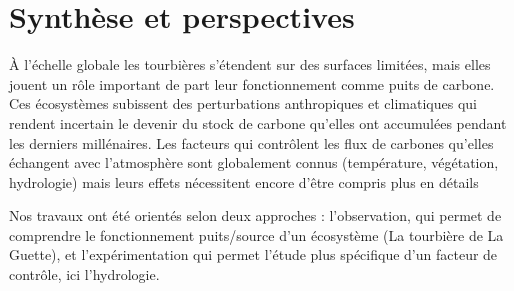 \chapter*{Synthèse et perspectives}
\newpage




À l'échelle globale les tourbières s'étendent sur des surfaces limitées, mais elles jouent un rôle important de part leur fonctionnement comme puits de carbone.
Ces écosystèmes subissent des perturbations anthropiques et climatiques qui rendent incertain le devenir du stock de carbone qu'elles ont accumulées pendant les derniers millénaires.
Les facteurs qui contrôlent les flux de carbones qu'elles échangent avec l'atmosphère sont globalement connus (température, végétation, hydrologie) mais leurs effets nécessitent encore d'être compris plus en détails

Nos travaux ont été orientés selon deux approches : l'observation, qui permet de comprendre le fonctionnement puits/source d'un écosystème (La tourbière de La Guette), et l'expérimentation qui permet l'étude plus spécifique d'un facteur de contrôle, ici l'hydrologie.

